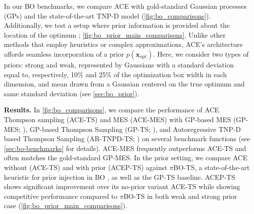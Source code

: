 \documentclass[twoside]{article}
\newcommand{\x}{\mathbf{x}}
\newcommand{\xopt}{\x_\text{opt}}
\begin{document}
In our BO benchmarks, we compare ACE with gold-standard Gaussian processes (GPs) and the state-of-the-art TNP-D model (\cref{fig:bo_comparisons}). Additionally, we test a setup where prior information is provided about the location of the optimum \citep{souza2021bayesian, hvarfner2022pi, muller2023pfns4bo}; \cref{fig:bo_prior_main_comparisons}. 
Unlike other methods that employ heuristics or complex approximations, ACE's architecture affords seamless incorporation of a prior $p(\xopt)$. 
Here, we consider two types of priors: strong and weak, represented by Gaussians with a standard deviation equal to, respectively, 10\% and 25\% of the optimization box width in each dimension, and mean drawn from a Gaussian centered on the true optimum and same standard deviation (see \cref{sec:bo_prior}).

\textbf{Results.} In \cref{fig:bo_comparisons}, we compare the performance of ACE Thompson sampling (ACE-TS) and MES (ACE-MES) with GP-based MES (GP-MES; \citealp{wang2017max}), GP-based Thompson Sampling (GP-TS; \citealp{balandat2020botorch}), and Autoregressive TNP-D based Thompson Sampling (AR-TNPD-TS; \citealp{bruinsma2023autoregressive,nguyen2022transformer}) on several benchmark functions  (see \cref{sec:bo-benchmarks} for details).
ACE-MES frequently outperforms ACE-TS and often matches the gold-standard GP-MES. In the prior setting, we compare ACE without (ACE-TS) and with prior (ACEP-TS) against $\pi$BO-TS, a state-of-the-art heuristic for prior injection in BO \citep{hvarfner2022pi}, as well as the GP-TS baseline. ACEP-TS shows significant improvement over its no-prior variant ACE-TS while showing competitive performance compared to $\pi$BO-TS in both weak and strong prior case (\cref{fig:bo_prior_main_comparisons}).
\end{document}
